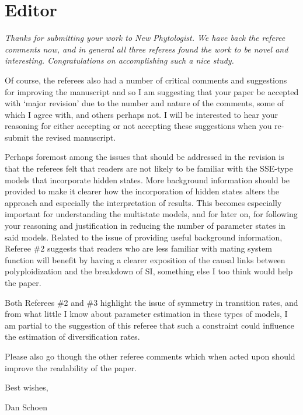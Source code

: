 \documentclass[11pt]{article}
\renewenvironment{quote}{\bigskip\noindent\itshape\ignorespaces}{\smallskip}
\begin{document}
\section{Editor}
\vspace{-11pt}

\begin{quote}
Thanks for submitting your work to New Phytologist.
We have back the referee comments now, and in general all three referees found the work to be novel and interesting.
Congratulations on accomplishing such a nice study.

Of course, the referees also had a number of critical comments and suggestions for improving the manuscript and so I am suggesting that your paper be accepted with `major revision' due to the number and nature of the comments, some of which I agree with, and others perhaps not.
I will be interested to hear your reasoning for either accepting or not accepting these suggestions when you re-submit the revised manuscript.

Perhaps foremost among the issues that should be addressed in the revision is that the referees felt that readers are not likely to be familiar with the SSE-type models that incorporate hidden states.
More background information should be provided to make it clearer how the incorporation of hidden states alters the approach and especially the interpretation of results.
This becomes especially important for understanding the multistate models, and for later on, for following your reasoning and justification in reducing the number of parameter states in said models.
Related to the issue of providing useful background information, Referee \#2 suggests that readers who are less familiar with mating system function will benefit by having a clearer exposition of the causal links between polyploidization and the breakdown of SI, something else I too think would help the paper.

Both Referees \#2 and \#3 highlight the issue of symmetry in transition rates, and from what little I know about parameter estimation in these types of models, I am partial to the suggestion of this referee that such a constraint could influence the estimation of diversification rates.

Please also go though the other referee comments which when acted upon should improve the readability of the paper.

Best wishes,

Dan Schoen
\end{quote}
\end{document}
